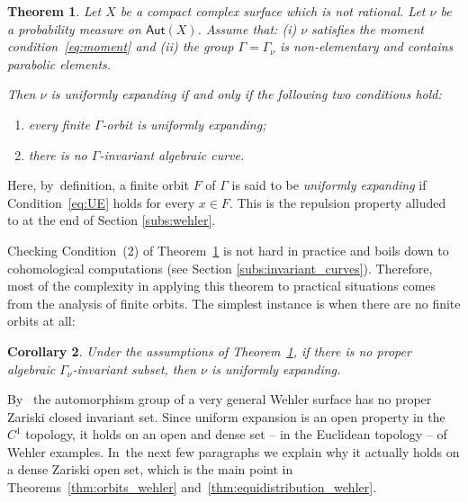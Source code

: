 \documentclass[JEP,XML,SOM,Unicode,published]{cedram}
\newcommand\Aut{\mathsf{Aut}}
\theoremstyle{plain}
\newtheorem{thm}{Theorem}[section]
\newtheorem{cor}[thm]{Corollary}
\theoremstyle{definition}
\begin{document}
\begin{thm}\label{thm:criterion_uniform_expansion_parabolic}
Let $X$ be a compact complex surface which is not rational.
Let $\nu$ be a probability measure on $\Aut(X)$. Assume that:
{\em{(i)}} $\nu$ satisfies the moment condition~\eqref{eq:moment} and {\em{(ii)}} the group
$\Gamma = \Gamma_\nu$ is non-elementary and contains parabolic elements.

Then $\nu$ is uniformly expanding if and only if the following two conditions hold:
\begin{enumerate}
\item\label{thm:criterion_uniform_expansion_parabolic1} every finite $\Gamma$-orbit is uniformly expanding;
\item\label{thm:criterion_uniform_expansion_parabolic2} there is no $\Gamma$-invariant algebraic curve.
\end{enumerate}
\end{thm}

Here, by~definition,
a finite orbit $F$ of $\Gamma$ is said to be \emph{uniformly expanding} if Condition~\eqref{eq:UE}
holds for every $x\in F$. This is the repulsion property alluded to at the end of Section \ref{subs:wehler}.

Checking Condition~(2)
of Theorem~\ref{thm:criterion_uniform_expansion_parabolic} is not hard in practice and boils down to cohomological computations
(see Section \ref{subs:invariant_curves}). Therefore, most of the complexity in applying this theorem to practical situations
comes from the analysis of finite orbits. The simplest instance is when there are no finite orbits at all:

\begin{cor}\label{cor:no_algebraic_invariant_subset}
Under the assumptions of Theorem~\ref{thm:criterion_uniform_expansion_parabolic}, if there is no proper algebraic $\Gamma_\nu$-invariant subset, then
$\nu$ is uniformly expanding.
\end{cor}

By~\cite[Th.\,A]{finite_orbits}
the automorphism group of a very general Wehler surface has no proper Zariski closed invariant set. Since uniform expansion is an open property in the $C^1$ topology,
it holds on an open and dense set -- in the Euclidean topology -- of Wehler examples. In~the next few paragraphs we explain why it actually holds on a dense Zariski open set,
which is the main point in Theorems~\ref{thm:orbits_wehler} and~\ref{thm:equidistribution_wehler}.
\end{document}
